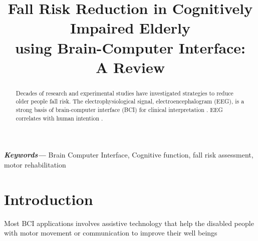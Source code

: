 \documentclass[conference,compsoc]{IEEEtran}
\providecommand{\keywords}[1]
{
  \small	
  \textbf{\textit{Keywords---}} #1
}
\begin{document}
%
\title{Fall Risk Reduction in Cognitively Impaired Elderly \\using Brain-Computer Interface: \\A Review}


\author{
}


\maketitle

\begin{abstract}
Decades of research and experimental studies have investigated strategies to reduce older people fall risk. The electrophysiological signal, electroencephalogram (EEG),  is a strong basis of brain-computer interface (BCI) for clinical interpretation \cite{Panoulas_2010,Mane_2020}. EEG correlates with human intention \cite{Panoulas_2010}.
\end{abstract}

\keywords{Brain Computer Interface, Cognitive function, fall risk assessment, motor rehabilitation}

\IEEEpeerreviewmaketitle


\section{Introduction}
Most BCI applications involves assistive technology that help the disabled people with motor movement or communication to improve their well beings\cite{Kubler_2006}
\end{document}
